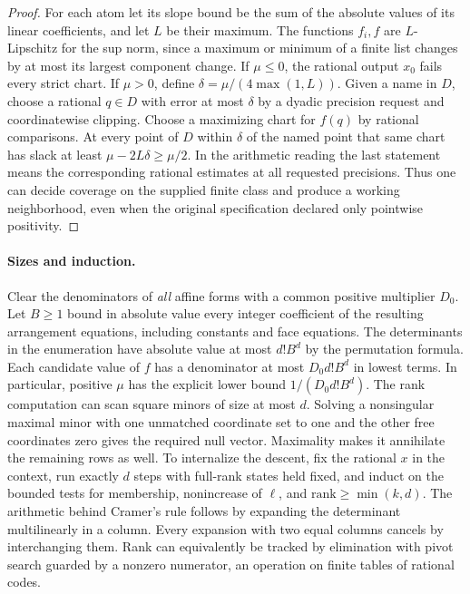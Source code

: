 \begin{proof}
For each atom let its slope bound be the sum of the absolute values of its linear coefficients, and let $L$ be their maximum. The functions $f_i,f$ are $L$-Lipschitz for the sup norm, since a maximum or minimum of a finite list changes by at most its largest component change. If $\mu\le0$, the rational output $x_0$ fails every strict chart. If $\mu>0$, define $\delta=\mu/(4\max(1,L))$. Given a name in $D$, choose a rational $q\in D$ with error at most $\delta$ by a dyadic precision request and coordinatewise clipping. Choose a maximizing chart for $f(q)$ by rational comparisons. At every point of $D$ within $\delta$ of the named point that same chart has slack at least $\mu-2L\delta\ge\mu/2$. In the arithmetic reading the last statement means the corresponding rational estimates at all requested precisions. Thus one can decide coverage on the supplied finite class and produce a working neighborhood, even when the original specification declared only pointwise positivity.
\end{proof}

\paragraph{Sizes and induction.}
Clear the denominators of \emph{all} affine forms with a common positive multiplier $D_0$. Let $B\ge1$ bound in absolute value every integer coefficient of the resulting arrangement equations, including constants and face equations. The determinants in the enumeration have absolute value at most $d!B^d$ by the permutation formula. Each candidate value of $f$ has a denominator at most $D_0d!B^d$ in lowest terms. In particular, positive $\mu$ has the explicit lower bound $1/(D_0d!B^d)$. The rank computation can scan square minors of size at most $d$. Solving a nonsingular maximal minor with one unmatched coordinate set to one and the other free coordinates zero gives the required null vector. Maximality makes it annihilate the remaining rows as well. To internalize the descent, fix the rational $x$ in the context, run exactly $d$ steps with full-rank states held fixed, and induct on the bounded tests for membership, nonincrease of $\ell$, and $\mathrm{rank}\ge\min(k,d)$. The arithmetic behind Cramer's rule follows by expanding the determinant multilinearly in a column. Every expansion with two equal columns cancels by interchanging them. Rank can equivalently be tracked by elimination with pivot search guarded by a nonzero numerator, an operation on finite tables of rational codes.

